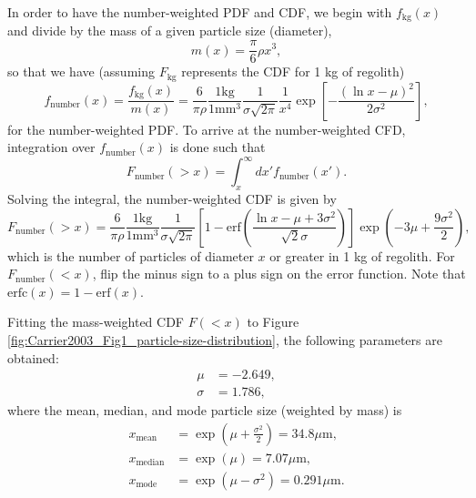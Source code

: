 \documentclass{article}
\begin{document}
In order to have the number-weighted PDF and CDF, we begin with $f_{\text{kg}}(x)$ and divide by the mass of a given particle size (diameter), \citep[e.g., Equation (7) of~][]{koschny2001impacts_mass}
\begin{equation}
m(x) = \frac{\pi}{6}\rho x^3,
\end{equation}
so that we have (assuming $F_{\text{kg}}$ represents the CDF for 1 kg of regolith)
\begin{equation}
f_{\text{number}}(x) = \frac{f_{\text{kg}}(x)}{m(x)} = \frac{6}{\pi\rho}\frac{1 \text{kg}}{1 \text{mm}^3}\frac{1}{\sigma\sqrt{2\pi}}
\frac{1}{x^4}\exp\left[-\frac{(\ln x - \mu)^2}{2\sigma^2}\right],
\end{equation}
for the number-weighted PDF. To arrive at the number-weighted CFD, integration over $f_{\text{number}}(x)$ is done such that
\begin{equation}
F_{\text{number}}(>x) = \int_{x}^{\infty}dx' f_{\text{number}}(x').
\end{equation}
Solving the integral, the number-weighted CDF is given by
\begin{equation}\label{eq:number_CFD_regolith}
F_{\text{number}}(>x) = \frac{6}{\pi\rho}\frac{1 \text{kg}}{1 \text{mm}^3}\frac{1}{\sigma\sqrt{2\pi}}
\left[1 - \text{erf}\left(\frac{\ln x - \mu + 3\sigma^2}{\sqrt{2}\sigma}\right)\right]\exp\left(-3\mu + \frac{9\sigma^2}{2}\right),
\end{equation}
which is the number of particles of diameter $x$ or greater in 1 kg of regolith. For $F_{\text{number}}(<x)$, flip the minus sign to a plus sign on the error function. Note that $\text{erfc}(x) = 1- \text{erf}(x)$.

Fitting the mass-weighted CDF $F(<x)$ to Figure \ref{fig:Carrier2003_Fig1_particle-size-distribution}, the following parameters are obtained:
\begin{align}
\mu &= -2.649,\\
\sigma &= 1.786,
\end{align}
where the mean, median, and mode particle size (weighted by mass) is
\begin{align}
x_{\text{mean}} &= \exp\left(\mu + \frac{\sigma^2}{2}\right) = 34.8 \text{$\mu$m},\\
x_{\text{median}} &= \exp(\mu) = 7.07 \text{$\mu$m},\\
x_{\text{mode}} &=  \exp\left(\mu - \sigma^2\right) = 0.291 \text{$\mu$m}.
\end{align}
\end{document}
